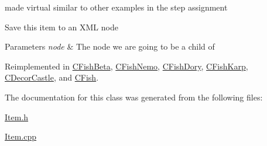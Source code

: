made virtual similar to other examples in the step assignment 

Save this item to an X\+ML node 
\begin{DoxyParams}{Parameters}
{\em node} & The node we are going to be a child of \\
\hline
\end{DoxyParams}


Reimplemented in \mbox{\hyperlink{class_c_fish_beta_a0be2886a531ede77bfa5338fec71d71b}{C\+Fish\+Beta}}, \mbox{\hyperlink{class_c_fish_nemo_ae9fd9446cd4852c9d9a78831bec0f32f}{C\+Fish\+Nemo}}, \mbox{\hyperlink{class_c_fish_dory_ac906b7f952cdbc52a72d1e87c9228ad9}{C\+Fish\+Dory}}, \mbox{\hyperlink{class_c_fish_karp_a182d8cce606be73a981bd140aca64ba8}{C\+Fish\+Karp}}, \mbox{\hyperlink{class_c_decor_castle_a83ecb7c898679e55dcafbc6492bc38d0}{C\+Decor\+Castle}}, and \mbox{\hyperlink{class_c_fish_abfc997d2d755be8f94069c57e75a854b}{C\+Fish}}.



The documentation for this class was generated from the following files\+:\begin{DoxyCompactItemize}
\item 
\mbox{\hyperlink{_item_8h}{Item.\+h}}\item 
\mbox{\hyperlink{_item_8cpp}{Item.\+cpp}}\end{DoxyCompactItemize}
